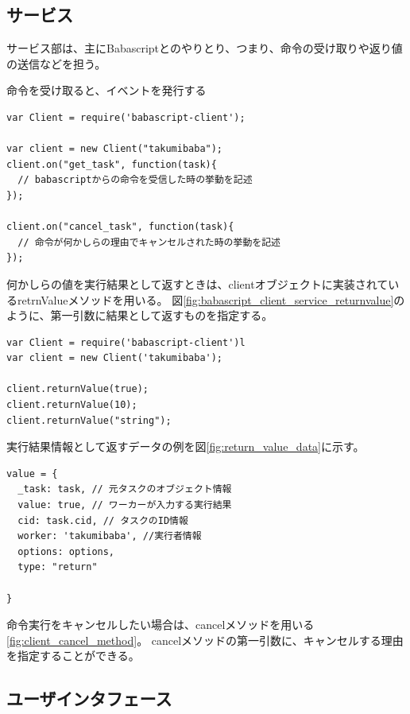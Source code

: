 \subsection{サービス}\label{ux30b5ux30fcux30d3ux30b9}

サービス部は、主にBabascriptとのやりとり、つまり、命令の受け取りや返り値の送信などを担う。

命令を受け取ると、イベントを発行する

\begin{lstlisting}[caption=Babascript Agent サービス部のソースコード例, label=code:babascriptux5fclientux5fservice]
var Client = require('babascript-client');

var client = new Client("takumibaba");
client.on("get_task", function(task){
  // babascriptからの命令を受信した時の挙動を記述
});

client.on("cancel_task", function(task){
  // 命令が何かしらの理由でキャンセルされた時の挙動を記述
});
\end{lstlisting}

何かしらの値を実行結果として返すときは、clientオブジェクトに実装されているretrnValueメソッドを用いる。
図\ref{fig:babascript_client_service_returnvalue}のように、第一引数に結果として返すものを指定する。

\begin{lstlisting}[caption=Babascript Agent 処理結果を返すメソッドの例, label=code:babascriptux5fclientux5fserviceux5freturnvalue]
var Client = require('babascript-client')l
var client = new Client('takumibaba');

client.returnValue(true);
client.returnValue(10);
client.returnValue("string");
\end{lstlisting}

実行結果情報として返すデータの例を図\ref{fig:return_value_data}に示す。

\begin{lstlisting}[caption=タスク情報, label=code:returnux5fvalueux5fdata]
value = {
  _task: task, // 元タスクのオブジェクト情報
  value: true, // ワーカーが入力する実行結果
  cid: task.cid, // タスクのID情報
  worker: 'takumibaba', //実行者情報
  options: options,
  type: "return"

}
\end{lstlisting}

命令実行をキャンセルしたい場合は、cancelメソッドを用いる\ref{fig:client_cancel_method}。
cancelメソッドの第一引数に、キャンセルする理由を指定することができる。

\subsection{ユーザインタフェース}\label{ux30e6ux30fcux30b6ux30a4ux30f3ux30bfux30d5ux30a7ux30fcux30b9}

